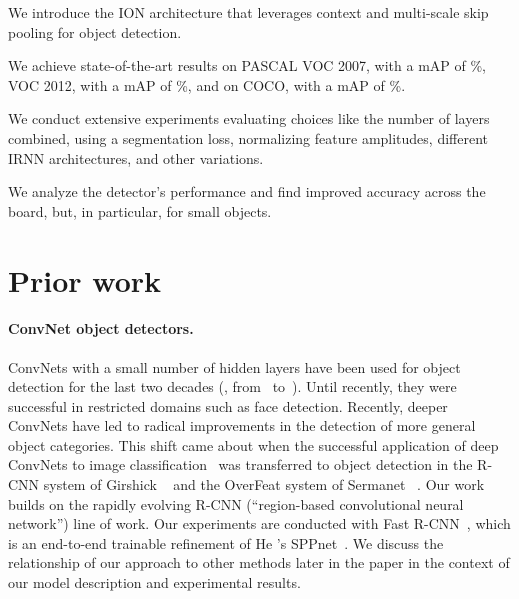 \documentclass[10pt,twocolumn,letterpaper]{article}
\begin{document}
\begin{packed_enum}
\item We introduce the ION architecture that leverages context and multi-scale
  skip pooling for object detection.

\item We achieve state-of-the-art results on PASCAL VOC 2007, with a mAP of
  \BestVOCSevenTest{}\%, VOC 2012, with a mAP of \BestVOCTwelveTest{}\%,
  and on COCO, with a mAP of \BestCOCOTest{}\%.

\item We conduct extensive experiments evaluating choices like the number of
layers combined, using a segmentation loss, normalizing feature amplitudes,
different IRNN architectures, and other variations.

\item We analyze the detector's performance and find improved accuracy across
the board, but, in particular, for small objects.
\end{packed_enum}%
\section{Prior work}\paragraph{ConvNet object detectors.}
ConvNets with a small number of hidden layers have been used for object
detection for the last two decades (\eg, from~\cite{lecun94} to~\cite{sermanetCVPR13}).  Until
recently, they were successful in restricted domains such as face detection.
Recently, deeper ConvNets have led to radical improvements in the
detection of more general object categories.  This shift came about when the
successful application of deep ConvNets to image
classification~\cite{krizhevsky2012imagenet} was transferred to object detection
in the R-CNN system of Girshick \etal~\cite{girshick2014rcnn} and the OverFeat
system of Sermanet \etal~\cite{overfeat}.  Our work builds on the rapidly
evolving R-CNN (``region-based convolutional neural network'') line of work.
Our experiments are conducted with Fast R-CNN~\cite{fast-rcnn},
which is an end-to-end trainable refinement of He \etal's SPPnet~\cite{sppnet}.
We discuss the relationship of our approach to other methods later in the paper
in the context of our model description and experimental results.
\end{document}
